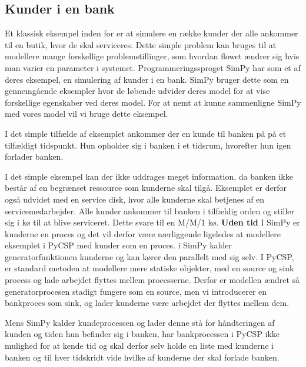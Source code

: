 \subsection{Kunder i en bank} Et klassisk eksempel inden for \des er at simulere  
en række kunder der alle ankommer til en butik, hvor de skal serviceres. Dette 
simple problem kan bruges til at modellere mange forskellige 
problemstillinger, som hvordan flowet ændrer sig hvis man varier en parameter 
i systemet. Programmeringssproget SimPy har som et af deres eksempel, en 
simulering af kunder i en bank. SimPy bruger dette som en gennemgående 
eksempler hvor de løbende udvider deres model for at vise forskellige 
egenskaber ved deres model. For at nemt at kunne sammenligne SimPy  med vores 
model vil vi bruge dette eksempel.

I det simple tilfælde af eksemplet ankommer der en kunde til banken på på et 
tilfældigt tidspunkt. Hun opholder sig i banken i et tidsrum, hvorefter hun 
igen forlader banken.

I det simple eksempel kan der ikke uddrages meget information, da banken ikke 
består af en begrænset ressource som kunderne skal tilgå.  Eksemplet er derfor 
også udvidet med en service disk, hvor alle kunderne skal betjenes af en 
servicemedarbejder. Alle kunder ankommer til banken i tilfældig orden og 
stiller sig i kø til at blive serviceret. Dette  svare til en M/M/1 kø.
\textbf{Uden tid}
I SimPy er kunderne en proces og det vil derfor være nærliggende ligeledes at 
modellere eksemplet i PyCSP med kunder som en proces. i SimPy kalder 
generatorfunktionen kunderne og kan kører den parallelt med sig selv. 
I PyCSP, er standard metoden at modellere mere statiske objekter, med en source og sink 
process og lade arbejdet flyttes mellem processerne. Derfor er modellen ændret 
så  generatorprocesen stadigt fungere som en source, men vi introducerer en 
bankproces som sink, og lader kunderne være arbejdet der flyttes mellem dem. 

Mens SimPy  kalder kundeprocessen og lader denne stå for håndteringen af 
kunden og tiden hun befinder sig i banken, har bankprocessen i PyCSP ikke 
mulighed for at kende tid og skal derfor selv holde en liste med kunderne 
i banken og  til hver tidskridt vide hvilke af kunderne der skal forlade 
banken. 

